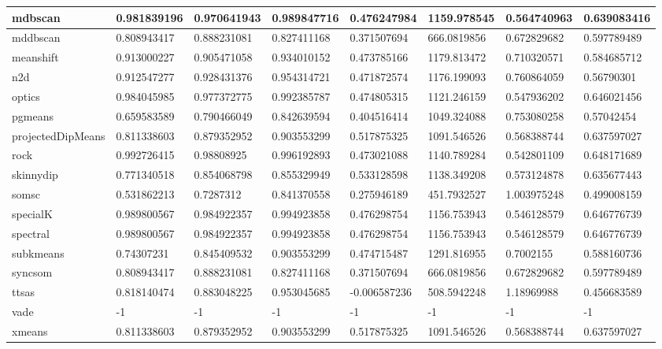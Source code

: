 \begin{table}[H]
\begin{tabular}{|l|l|l|l|l|l|l|l|}
\hline
mdbscan & 0.981839196 & 0.970641943 & 0.989847716 & 0.476247984 & 1159.978545 & 0.564740963 & 0.639083416 \\
\hline
mddbscan & 0.808943417 & 0.888231081 & 0.827411168 & 0.371507694 & 666.0819856 & 0.672829682 & 0.597789489 \\
\hline
meanshift & 0.913000227 & 0.905471058 & 0.934010152 & 0.473785166 & 1179.813472 & 0.710320571 & 0.584685712 \\
\hline
n2d & 0.912547277 & 0.928431376 & 0.954314721 & 0.471872574 & 1176.199093 & 0.760864059 & 0.56790301 \\
\hline
optics & 0.984045985 & 0.977372775 & 0.992385787 & 0.474805315 & 1121.246159 & 0.547936202 & 0.646021456 \\
\hline
pgmeans & 0.659583589 & 0.790466049 & 0.842639594 & 0.404516414 & 1049.324088 & 0.753080258 & 0.57042454 \\
\hline
projectedDipMeans & 0.811338603 & 0.879352952 & 0.903553299 & 0.517875325 & 1091.546526 & 0.568388744 & 0.637597027 \\
\hline
rock & 0.992726415 & 0.98808925 & 0.996192893 & 0.473021088 & 1140.789284 & 0.542801109 & 0.648171689 \\
\hline
skinnydip & 0.771340518 & 0.854068798 & 0.855329949 & 0.533128598 & 1138.349208 & 0.573124878 & 0.635677443 \\
\hline
somsc & 0.531862213 & 0.7287312 & 0.841370558 & 0.275946189 & 451.7932527 & 1.003975248 & 0.499008159 \\
\hline
specialK & 0.989800567 & 0.984922357 & 0.994923858 & 0.476298754 & 1156.753943 & 0.546128579 & 0.646776739 \\
\hline
spectral & 0.989800567 & 0.984922357 & 0.994923858 & 0.476298754 & 1156.753943 & 0.546128579 & 0.646776739 \\
\hline
subkmeans & 0.74307231 & 0.845409532 & 0.903553299 & 0.474715487 & 1291.816955 & 0.7002155 & 0.588160736 \\
\hline
syncsom & 0.808943417 & 0.888231081 & 0.827411168 & 0.371507694 & 666.0819856 & 0.672829682 & 0.597789489 \\
\hline
ttsas & 0.818140474 & 0.883048225 & 0.953045685 & -0.006587236 & 508.5942248 & 1.18969988 & 0.456683589 \\
\hline
vade & -1 & -1 & -1 & -1 & -1 & -1 & -1 \\
\hline
xmeans & 0.811338603 & 0.879352952 & 0.903553299 & 0.517875325 & 1091.546526 & 0.568388744 & 0.637597027 \\
\hline
\end{tabular}
\end{table}
